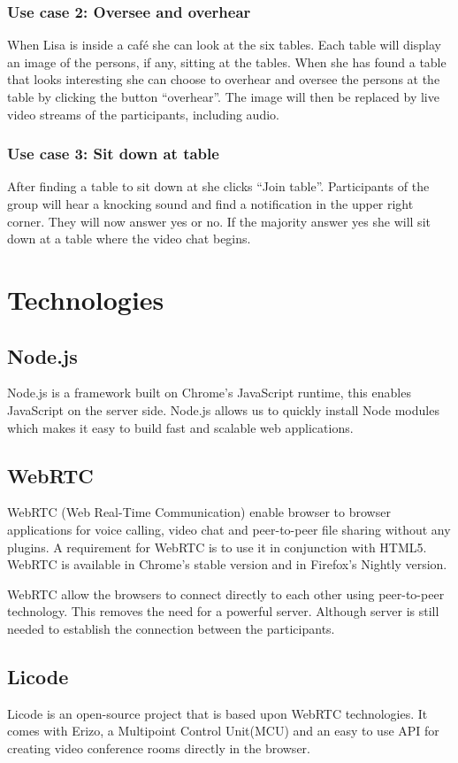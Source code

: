 \documentclass[12pt, titlepage]{article}
\begin{document}
\subsubsection{Use case 2: Oversee and overhear}
When Lisa is inside a café she can look at the six tables. Each table will display an image of the persons, if any, sitting at the tables. When she has found a table that looks interesting she can choose to overhear and oversee the persons at the table by clicking the button “overhear”. The image will then be replaced by live video streams of the participants, including audio.
\subsubsection{Use case 3: Sit down at table}
After finding a table to sit down at she clicks “Join table”. Participants of the group will hear a knocking sound and find a notification in the upper right corner. They will now answer yes or no. If the majority answer yes she will sit down at a table where the video chat begins.
\section{Technologies}
\subsection{Node.js}
Node.js\cite{26} is a framework built on Chrome's JavaScript runtime, this enables JavaScript on the server side. Node.js allows us to quickly install Node modules which makes it easy to build fast and scalable web applications. 
\subsection{WebRTC}
WebRTC\cite{27} (Web Real-Time Communication) enable browser to browser applications for voice calling, video chat and peer-to-peer file sharing without any plugins. A requirement for WebRTC is to use it in conjunction with HTML5. WebRTC is available in Chrome's stable version and in Firefox's Nightly version.

WebRTC allow the browsers to connect directly to each other using peer-to-peer technology. This removes the need for a powerful server. Although server is still needed to establish the connection between the participants.
\subsection{Licode}
Licode\cite{28} is an open-source project that is based upon WebRTC technologies. It comes with Erizo, a Multipoint Control Unit(MCU) and an easy to use API for creating video conference rooms directly in the browser. 
\end{document}
